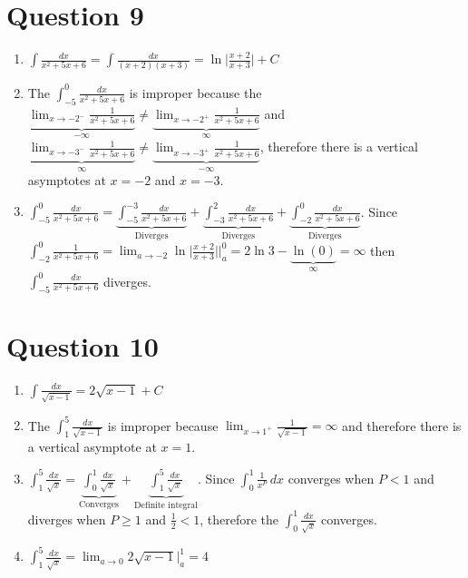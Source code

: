 \documentclass[12pt]{article}
\begin{document}
\section*{Question 9}
\begin{enumerate}
    \item $\int \frac{dx}{x^2+5x+6} =\int \frac{dx}{(x+2)(x+3)} =\ln\bigg|\frac{x+2}{x+3}\bigg| + C$
    \item The $\int_{-5}^{0} \frac{dx}{x^2+5x+6}$ is improper because the $\underbrace{\lim_{x\to-2^-} \frac{1}{x^2+5x+6}}_{-\infty}  \neq \underbrace{\lim_{x\to-2^+} \frac{1}{x^2+5x+6}}_{\infty}$ and $\underbrace{\lim_{x\to-3^-} \frac{1}{x^2+5x+6}}_{\infty}  \neq \underbrace{\lim_{x\to-3^+} \frac{1}{x^2+5x+6}}_{-\infty}$, therefore there is a vertical asymptotes at $x=-2$ and $x=-3$.
    \item $\int_{-5}^{0} \frac{dx}{x^2+5x+6} = \underbrace{\int_{-5}^{-3} \frac{dx}{x^2+5x+6}}_{\text{Diverges}} + \underbrace{\int_{-3}^{2} \frac{dx}{x^2+5x+6}}_{\text{Diverges}} + \underbrace{\int_{-2}^{0}\frac{dx}{x^2+5x+6}}_{\text{Diverges}}$. Since $\int_{-2}^{0}\frac{1}{x^2+5x+6} =\lim_{a\to-2} \ln\bigg|\frac{x+2}{x+3}\bigg| \biggr\rvert_{a}^{0}= 2\ln 3 - \underbrace{\ln (0)}_{\infty}  = \infty$ then $\int_{-5}^{0} \frac{dx}{x^2+5x+6}$ diverges.
\end{enumerate}
\section*{Question 10}
\begin{enumerate}
     \item $\int \frac{dx}{\sqrt{x-1}} = 2\sqrt{x-1} +C$
     \item The $\int_{1}^{5} \frac{dx}{\sqrt{x-1}}$ is improper because $\lim_{x\to 1^+} \frac{1}{\sqrt{x-1}} = \infty$ and therefore there is a vertical asymptote at $x=1$.
     \item $\int_{1}^{5} \frac{dx}{\sqrt{x}} = \underbrace{\int_{0}^{1} \frac{dx}{\sqrt{x}}}_{\text{Converges}} + \underbrace{\int_{1}^{5} \frac{dx}{\sqrt{x}}}_{\text{Definite integral}}$. Since $\int_{0}^{1} \frac{1}{x^P} \, dx$ converges when $P<1$ and diverges when $P\geq 1$ and $\frac{1}{2}<1$, therefore the $\int_{0}^{1} \frac{dx}{\sqrt{x}}$ converges.
     \item $\int_{1}^{5} \frac{dx}{\sqrt{x}} = \lim_{a\to 0} 2\sqrt{x-1}\biggr\rvert_{a}^{1} = 4$
     
\end{enumerate}
\end{document}
